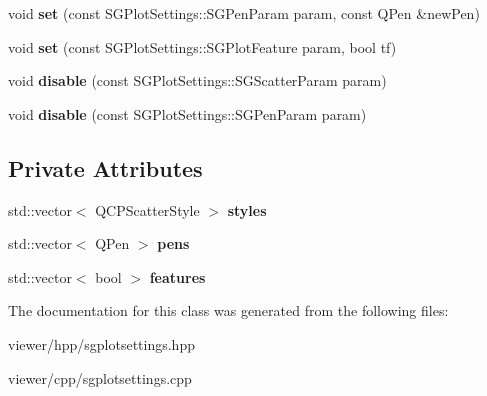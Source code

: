 \begin{DoxyCompactItemize}
\item 
\mbox{\label{classSGPlotSettings_a2d1695078c94a973dfb0b6fd9910c2a2}} 
void {\bfseries set} (const S\+G\+Plot\+Settings\+::\+S\+G\+Pen\+Param param, const Q\+Pen \&new\+Pen)
\item 
\mbox{\label{classSGPlotSettings_a150ebe4d84dbb7bcdc05385bc8091bac}} 
void {\bfseries set} (const S\+G\+Plot\+Settings\+::\+S\+G\+Plot\+Feature param, bool tf)
\item 
\mbox{\label{classSGPlotSettings_af8b8b771f3897f7487e9dfbaf88a2a89}} 
void {\bfseries disable} (const S\+G\+Plot\+Settings\+::\+S\+G\+Scatter\+Param param)
\item 
\mbox{\label{classSGPlotSettings_a7d3f2e58941f5f76e193bf567a83b49b}} 
void {\bfseries disable} (const S\+G\+Plot\+Settings\+::\+S\+G\+Pen\+Param param)
\end{DoxyCompactItemize}
\subsection*{Private Attributes}
\begin{DoxyCompactItemize}
\item 
\mbox{\label{classSGPlotSettings_ac587d4f23d3beeb6506013f707cf8a3e}} 
std\+::vector$<$ Q\+C\+P\+Scatter\+Style $>$ {\bfseries styles}
\item 
\mbox{\label{classSGPlotSettings_aef45e112cea82b97bba0802b33b70ca0}} 
std\+::vector$<$ Q\+Pen $>$ {\bfseries pens}
\item 
\mbox{\label{classSGPlotSettings_af479e795f9fbc1bc1e2b98268f83a7c3}} 
std\+::vector$<$ bool $>$ {\bfseries features}
\end{DoxyCompactItemize}


The documentation for this class was generated from the following files\+:\begin{DoxyCompactItemize}
\item 
viewer/hpp/sgplotsettings.\+hpp\item 
viewer/cpp/sgplotsettings.\+cpp\end{DoxyCompactItemize}
